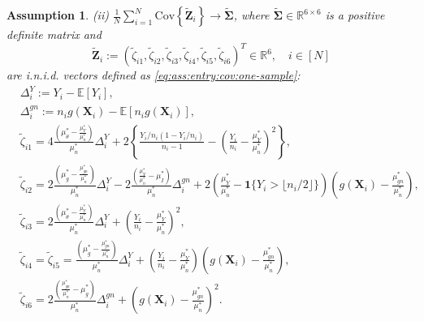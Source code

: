 \documentclass[12pt,letterpaper]{article}
\newtheorem{assumption}{Assumption}[section]
\begin{document}
\begin{assumption}
\noindent (ii) $\displaystyle\frac{1}{N}\sum_{i=1}^N\mathrm{Cov}\left\{\tilde{\mathbf{Z}}_i\right\}\rightarrow\widetilde{\boldsymbol{\Sigma}}$, where $\widetilde{\boldsymbol{\Sigma}}\in\mathbb{R}^{6\times 6}$ is a positive definite matrix and $$\tilde{\mathbf{Z}}_i:=(\tilde{\zeta}_{i1},\tilde{\zeta}_{i2},\tilde{\zeta}_{i3},\tilde{\zeta}_{i4},\tilde{\zeta}_{i5},\tilde{\zeta}_{i6})^T\in\mathbb{R}^6,\quad i\in[N]$$
are i.n.i.d. vectors defined as \eqref{eq:ass:entry:cov:one-sample}:
\begin{equation}\label{eq:ass:entry:cov:one-sample}
\begin{array}{rcl}
&\displaystyle\Delta_{i}^{Y}:=Y_i-\mathbb{E}[Y_i],&\\
&\displaystyle\Delta_i^{gn}:=n_ig(\mathbf{X}_i)-\mathbb{E}[n_ig(\mathbf{X}_i)],&\\
&\displaystyle\tilde{\zeta}_{i1}=4\frac{\left(\mu_{\theta}^*-\frac{\mu_Y^*}{\mu_n^*}\right)}{\mu_n^*}\Delta_{i}^{Y}+2\left\{\frac{Y_i/n_i(1-Y_i/n_i)}{n_i-1}-\left(\frac{Y_i}{n_i}-\frac{\mu_Y^*}{\mu_n^*}\right)^2\right\},&\\
&\displaystyle\tilde{\zeta}_{i2}=2\frac{\left(\mu_g^*-\frac{\mu_{gn}^*}{\mu_n^*}\right)}{\mu_n^*}\Delta_{i}^{Y}-2\frac{\left(\frac{\mu_Y^*}{\mu_n^*}-\mu_I^*\right)}{\mu_n^*}\Delta_i^{gn}+2\left(\frac{\mu_Y^*}{\mu_n^*}-\mathbf{1}\{Y_i>\lfloor n_i/2\rfloor\}\right)\left(g(\mathbf{X}_i)-\frac{\mu_{gn}^*}{\mu_n^*}\right),&\\
&\displaystyle\tilde{\zeta}_{i3}=2\frac{\left(\mu_{\theta}^*-\frac{\mu_Y^*}{\mu_n^*}\right)}{\mu_n^*}\Delta_{i}^{Y}+\left(\frac{Y_i}{n_i}-\frac{\mu_Y^*}{\mu_n^*}\right)^2,&\\
&\displaystyle\tilde{\zeta}_{i4}=\tilde{\zeta}_{i5}=\frac{\left(\mu_g^*-\frac{\mu_{gn}^*}{\mu_n^*}\right)}{\mu_n^*}\Delta_{i}^{Y}+\left(\frac{Y_i}{n_i}-\frac{\mu_Y^*}{\mu_n^*}\right)\left(g(\mathbf{X}_i)-\frac{\mu_{gn}^*}{\mu_n^*}\right),&\\
&\displaystyle\tilde{\zeta}_{i6}=2\frac{\left(\frac{\mu_{gn}^*}{\mu_n^*}-\mu_g^*\right)}{\mu_n^*}\Delta_i^{gn}+\left(g(\mathbf{X}_i)-\frac{\mu_{gn}^*}{\mu_n^*}\right)^2.&
\end{array}
\end{equation}
\end{assumption}
\end{document}
